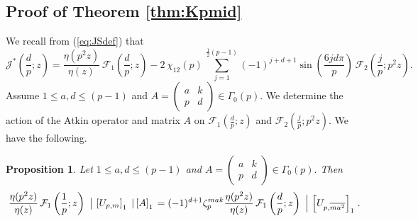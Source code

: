 \documentclass[12pt]{amsart}
\newtheorem{prop}[theorem]{Proposition}
\theoremstyle{definition}
\theoremstyle{remark}
\numberwithin{equation}{section}
\newcommand\Lpar[1]{\left(#1\right)}
\newcommand\Fell[4]{\mathcal{F}_{#1}\left(\frac{#2}{#3};#4\right)}
\newcommand\JSdpz[1]{\mathcal{J}^{*}\left(\frac{d}{p};{#1}\right)}
\newcommand\strokeb[2]{\,\left\arrowvert\,\left[#1\right]_#2\right.}
\newcommand\thm[1]{\ref{thm:#1}}
\newcommand\eqn[1]{(\ref{eq:#1})}
\begin{document}
\subsection{Proof of Theorem \thm{Kpmid}}

We recall from \eqn{JSdef} that
$$                   
\JSdpz{z}{} 
= \frac{\eta(p^2 z)}{\eta(z)} \, \Fell{1}{d}{p}{z}
 - 
2\,\chi_{12}(p) \,
\sum_{j=1}^{\frac{1}{2}(p-1)} (-1)^{j + d + 1} 
\sin\Lpar{\frac{6j d\pi}{p}} \,
\Fell{2}{j}{p}{p^2 z}.
$$
Assume $1 \le a,d \le (p-1)$ 
and
$A = \begin{pmatrix}
      a & k \\ p & d 
    \end{pmatrix}
\in \Gamma_0(p).$ We determine the action of the Atkin operator and matrix $A$ on $\Fell{1}{d}{p}{z}$ and $\Fell{2}{j}{p}{p^2 z}$. We have the following.

\begin{prop}\label{propo:F1transUA}
Let $1 \le a,d \le (p-1)$ and
$A = \begin{pmatrix}
      a & k \\ p & d 
    \end{pmatrix}
\in \Gamma_0(p).
$ Then
$$
\frac{\eta(p^2 z)}{\eta(z)} \, \Fell{1}{1}{p}{z}
\strokeb{U_{p,m}}{1} \strokeb{A}{1}
= (-1)^{d+1} \zeta_p^{mak} 
\frac{\eta(p^2 z)}{\eta(z)} \, \Fell{1}{d}{p}{z}
\strokeb{U_{p,\overline{ma^2}}}{1}.
$$\\
\end{prop}
\end{document}
